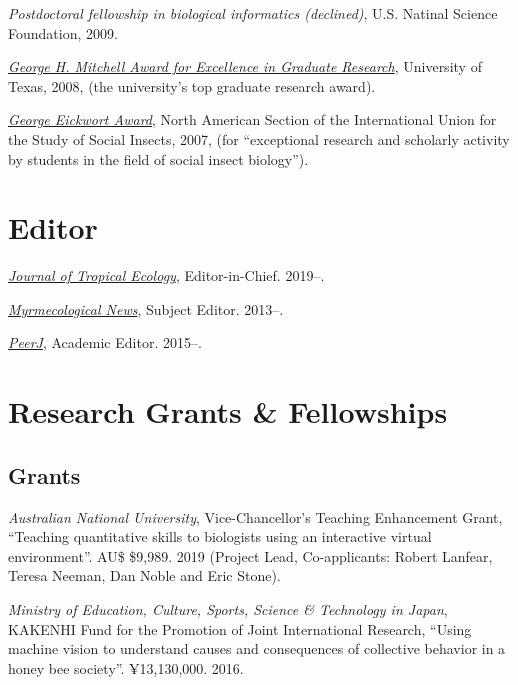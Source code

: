 \documentclass[11pt]{article}
\def\printdate#1{\xprintdate#1-}
\def\xprintdate#1-#2-#3-{#1}
\begin{document}
\ind \textit{Postdoctoral fellowship in biological informatics (\textit{declined})}, U.S. Natinal Science Foundation, 2009.

\ind \textit{\href{https://news.utexas.edu/2008/05/29/graduate-students-honored-for-excellence}{George H. Mitchell Award for Excellence in Graduate Research}}, University of Texas, 2008, (the university's top graduate research award).

\ind \textit{\href{http://iussi.cyberbee.net/wp-content/uploads/2010/04/2007\_Fall\_NAS-IUSSI\_Newsletter.pdf}{George Eickwort Award}}, North American Section of the International Union for the Study of
Social Insects, 2007, (for ``exceptional research and scholarly activity by students in the
field of social insect biology'').


\section{Editor}

\ind \textit{\href{https://mc.manuscriptcentral.com/jte}{Journal of Tropical Ecology}}, Editor-in-Chief. \printdate{2019-07-01}--.

\ind \textit{\href{http://openlogicproject.org/}{Myrmecological News}}, Subject Editor. \printdate{2013-00-00}--.

\ind \textit{\href{https://peerj.com/sasha/}{PeerJ}}, Academic Editor. \printdate{2015-00-00}--.


\section{Research Grants \& Fellowships}

\subsection{Grants}
\ind \textit{Australian National University}, Vice-Chancellor's Teaching Enhancement Grant, ``Teaching quantitative skills to biologists using an interactive virtual
environment''.  AU\$ \$9,989. 2019 (Project Lead, Co-applicants: Robert Lanfear, Teresa Neeman, Dan Noble
and Eric Stone).


\ind \textit{Ministry of Education, Culture, Sports, Science \& Technology in Japan}, KAKENHI Fund for the Promotion of Joint International Research, ``Using machine vision to understand causes and consequences of collective
behavior in a honey bee society''.  ¥13,130,000. 2016.
\end{document}

